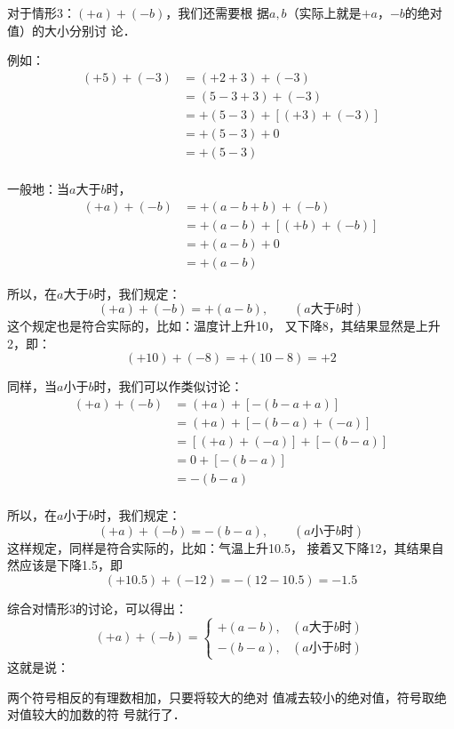 对于情形3：$(+a)+(-b)$，我们还需要根
据$a,b$（实际上就是$+a$，$-b$的绝对值）的大小分别讨
论．

例如：
\begin{align*}
(+5)+(-3)&=(+2+3)+(-3)\\
&=(5-3 + 3)+(-3)\\
&=+(5-3)+[(+3)+(-3)]\tag{加法结合律}\\
&=+(5-3)+0 \tag{相反数的性质}\\
&=+(5-3)\tag{零的特性}\\
\end{align*}

一般地：当$a$大于$b$时，
\begin{align*}
(+ a)+(-b)&=+(a-b + b)+(-b)\\
&=+(a-b)+[(+b)+(-b)]    \tag{加法结合律}\\
& =+(a-b) + 0 \tag{相反数的性质}\\
&  =+(a-b)\tag{零的特性}
\end{align*}

所以，在$a$大于$b$时，我们规定：
\[(+a)+(-b)=+(a-b),\qquad (\text{$a$大于$b$时})\]
这个规定也是符合实际的，比如：温度计上升10\oc，
又下降8\oc，其结果显然是上升2\oc，即：
\[     (+10)+(-8)=+(10-8)=+2\]

同样，当$a$小于$b$时，我们可以作类似讨论：
\begin{align*}
(+ a)+(-b)&=(+ a)+[-(b-a+a)]\\
& =(+ a)+[-(b-a)+( -a)]   \tag{情形2加法法则}\\
&=[(+ a)+(-a)]+[-(b-a) ]  \tag{加法交换、结合律}\\
&=0+[-(b-a)]\tag{相反数的特性}\\
&=-(b-a)\tag{零的特性}\\
\end{align*}


所以，在$a$小于$b$时，我们规定：
\[(+a)+(-b)=-(b-a),\qquad (\text{$a$小于$b$时})\]
这样规定，同样是符合实际的，比如：气温上升10.5\oc，
接着又下降12\oc，其结果自然应该是下降1.5\oc，即
\[(+10.5)+(-12)=-(12-10.5)=-1.5\]

综合对情形3的讨论，可以得出：
\[(+a)+(-b)=\begin{cases}
+(a-b),& (\text{$a$大于$b$时})\\
-(b-a),& (\text{$a$小于$b$时})
\end{cases}\]
这就是说：

\begin{blk}{}
	两个符号相反的有理数相加，只要将较大的绝对
	值减去较小的绝对值，符号取绝对值较大的加数的符
	号就行了．
\end{blk}

